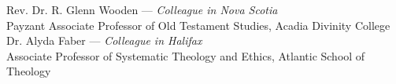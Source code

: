 \documentclass[11pt]{article}
\begin{document}
Rev. Dr. R. Glenn Wooden --- \emph{Colleague in Nova Scotia}\\
Payzant Associate Professor of Old Testament Studies, Acadia Divinity College\\




Dr. Alyda Faber --- \emph{Colleague in Halifax}\\
Associate Professor of Systematic Theology and Ethics, Atlantic School of Theology\\
\end{document}
